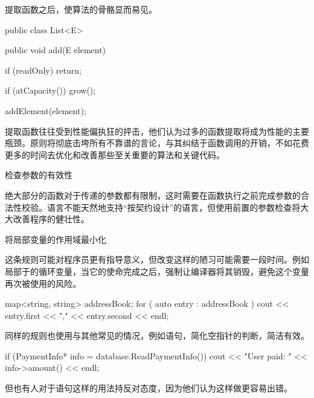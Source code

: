 \begin{content}
提取函数之后，使算法的骨骼显而易见。

\begin{leftbar}
\begin{java}
public class List<E> {
   public void add(E element) {
      if (readOnly)
         return;
      
      if (atCapacity())
         grow();
      
      addElement(element);
   }
}
\end{java}
\end{leftbar}

提取函数往往受到性能偏执狂的抨击，他们认为过多的函数提取将成为性能的主要瓶颈。原则将彻底击垮所有不靠谱的言论，与其纠结于函数调用的开销，不如花费更多的时间去优化和改善那些至关重要的算法和关键代码。

\begin{regulation}
检查参数的有效性
\end{regulation}

绝大部分的函数对于传递的参数都有限制，这时需要在函数执行之前完成参数的合法性校验。语言不能天然地支持“按契约设计”的语言，但使用前置的参数检查将大大改善程序的健壮性。

\begin{regulation}
将局部变量的作用域最小化
\end{regulation}

这条规则可能对程序员更有指导意义，但改变这样的陋习可能需要一段时间。例如局部于的循环变量，当它的使命完成之后，强制让编译器将其销毁，避免这个变量再次被使用的风险。

\begin{leftbar}
\begin{c++}
map<string, string> addressBook; 
for ( auto entry : addressBook ) 
{ 
    cout << entry.first << "," << entry.second << endl;
}
\end{c++}
\end{leftbar}

同样的规则也使用与其他常见的情况，例如语句，简化空指针的判断，简洁有效。

\begin{leftbar}
\begin{c++}
if (PaymentInfo* info = database.ReadPaymentInfo()) 
{
    cout << "User paid: " << info->amount() << endl;
}
\end{c++}
\end{leftbar}

但也有人对于语句这样的用法持反对态度，因为他们认为这样做更容易出错。


\end{content}
